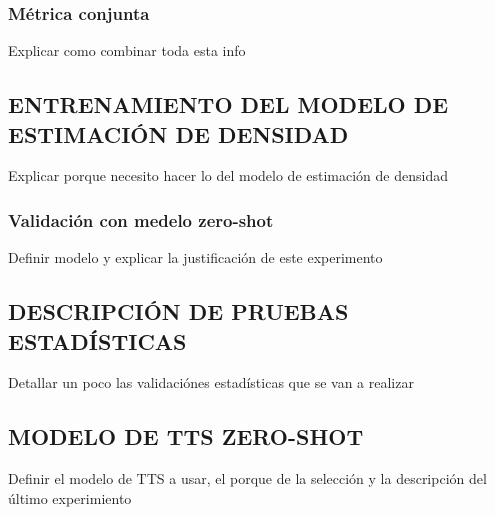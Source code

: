 \subsubsection{Métrica conjunta}
Explicar como combinar toda esta info

\subsection{ENTRENAMIENTO DEL MODELO DE ESTIMACIÓN DE DENSIDAD}
Explicar porque necesito hacer lo del modelo de estimación de densidad

\subsubsection{Validación con medelo zero-shot}
Definir modelo y explicar la justificación de este experimento

\subsection{DESCRIPCIÓN DE PRUEBAS ESTADÍSTICAS}
Detallar un poco las validaciónes estadísticas que se van a realizar

\subsection{MODELO DE TTS ZERO-SHOT}
Definir el modelo de TTS a usar, el porque de la selección y la descripción del último experimiento